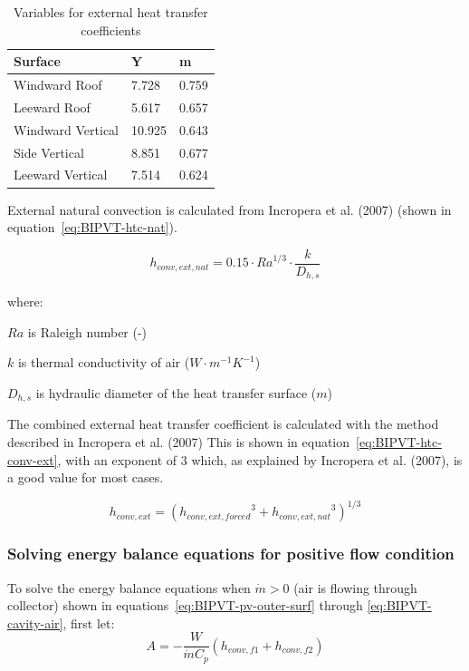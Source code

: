 {\begin{table}[htbp]
	\centering
		\begin{tabular}{lll}
\hline
Surface           & Y      & m     \\ \hline
Windward Roof     & 7.728  & 0.759 \\
Leeward Roof      & 5.617  & 0.657 \\
Windward Vertical & 10.925 & 0.643 \\
Side Vertical     & 8.851  & 0.677 \\
Leeward Vertical  & 7.514  & 0.624 \\ \hline
			
		\end{tabular}
	\caption{Variables for external heat transfer coefficients}
	\label{tab:BIPVT-table-htc-ext}
\end{table}


External natural convection is calculated from Incropera et al. (2007) (shown in equation~\ref{eq:BIPVT-htc-nat}).

\begin{equation}
h_{conv,ext,nat}=0.15\cdot{Ra}^{1/3}\cdot\frac{k}{D_{h,s}}
\label{eq:BIPVT-htc-nat}
\end{equation}

where:

\(Ra\) is Raleigh number (-)

\(k\) is thermal conductivity of air (\(W\cdot m^{-1}K^{-1}\))

\(D_{h,s}\) is hydraulic diameter of the heat transfer surface (\(m\))

The combined external heat transfer coefficient is calculated with the method described in Incropera et al. (2007) This is shown in equation~\ref{eq:BIPVT-htc-conv-ext}, with an exponent of 3 which, as explained by Incropera et al. (2007), is a good value for most cases.

\begin{equation}
h_{conv,ext}=\left({h_{conv,ext,forced}}^3+{h_{conv,ext,nat}}^3\right)^{1/3}
\label{eq:BIPVT-htc-conv-ext}
\end{equation}

\subsubsection{Solving energy balance equations for positive flow condition}\label{BIPVT-solving}

To solve the energy balance equations when \(\dot{m}>0\) (air is flowing through collector) shown in equations~\ref{eq:BIPVT-pv-outer-surf} through \ref{eq:BIPVT-cavity-air}, first let:
\begin{equation}
A=-\frac{W}{\dot{m}C_p}\left(h_{conv,f1}+h_{conv,f2}\right)
\label{eq:BIPVT-A}
\end{equation}

}
